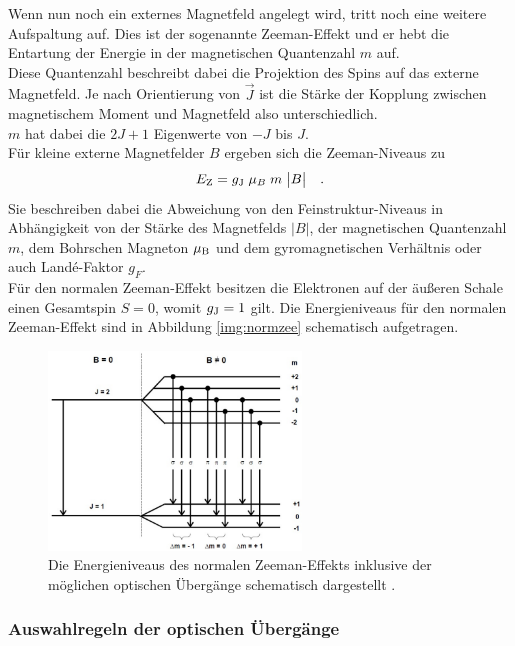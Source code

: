 \noindent
Wenn nun noch ein externes Magnetfeld angelegt wird, tritt noch eine weitere Aufspaltung auf.
Dies ist der sogenannte Zeeman-Effekt und er hebt die Entartung der Energie in der magnetischen Quantenzahl $m$ auf.\\
Diese Quantenzahl beschreibt dabei die Projektion des Spins auf das externe Magnetfeld. 
Je nach Orientierung von $\vec J$ ist die Stärke der Kopplung zwischen magnetischem Moment und Magnetfeld also unterschiedlich.\\
$m$ hat dabei die $2J+1$ Eigenwerte von $-J$ bis $J$.\\
Für kleine externe Magnetfelder $B$  ergeben sich die Zeeman-Niveaus zu 
\begin{equation}
    E_{\text{Z}} = g_{\text{J}}\; \mu_B \; m \;\bigl| B \bigr|\quad .
    \label{eqn:zeeman}
\end{equation}
Sie beschreiben dabei die Abweichung von den Feinstruktur-Niveaus in Abhängigkeit von der Stärke des Magnetfelds $\bigl| B \bigr|$, 
der magnetischen Quantenzahl $m$, dem Bohrschen Magneton $\mu_{\text{B}}$ und dem gyromagnetischen Verhältnis oder auch Landé-Faktor $g_F$.\\
Für den normalen Zeeman-Effekt besitzen die Elektronen auf der äußeren Schale einen Gesamtspin $S=0$, womit $g_{\text{J}} = 1$ gilt.
Die Energieniveaus für den normalen Zeeman-Effekt sind in Abbildung \autoref{img:normzee} schematisch aufgetragen.
\begin{figure}[H]
    \centering
    \includegraphics[width=0.6\textwidth]{latex/images/normalerzeeman.PNG}
    \caption{Die Energieniveaus des normalen Zeeman-Effekts inklusive der möglichen optischen Übergänge schematisch dargestellt \protect \cite{alt}.}
    \label{img:normzee}
\end{figure}

\subsubsection{Auswahlregeln der optischen Übergänge}

